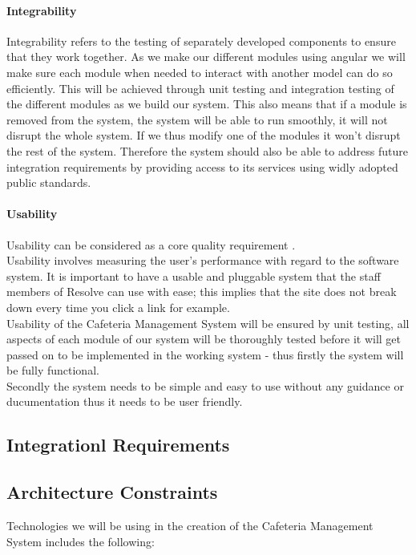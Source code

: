 \documentclass[12pt]{article}
\begin{document}
\paragraph{Integrability\\}
Integrability  refers to the testing of separately developed components to ensure that they work together. As we make our different  modules using angular we will make sure each module when needed to interact with another model can do so efficiently. This will be achieved through unit testing and integration testing of the different modules as we build our system. This also means that if a module is removed from the system, the system will be able to run smoothly, it will not disrupt the whole system. If we thus modify one of the modules it won't disrupt the rest of the system. 
Therefore the system should also be able to address future integration requirements by providing access to its services using widly adopted public standards.

\paragraph{Usability\\}
Usability can be considered as a core quality requirement . \\
Usability involves measuring the user's performance with regard to the software system.  It is important to have a usable and pluggable system that the staff members of Resolve can use with ease; this implies that the site does not break down every time you click a link for example. \\
Usability of the Cafeteria Management System will be ensured by unit testing, all aspects of each module of our system will be thoroughly  tested before it will get passed on to be implemented in the working system - thus firstly the system will be fully functional.\\
Secondly the system needs to be simple and easy to use without any guidance or ducumentation thus it needs to be user friendly. 



\subsection{Integrationl Requirements}

\subsection{Architecture Constraints}
Technologies we will be using in the creation of the Cafeteria Management System includes the following: 
\end{document}
